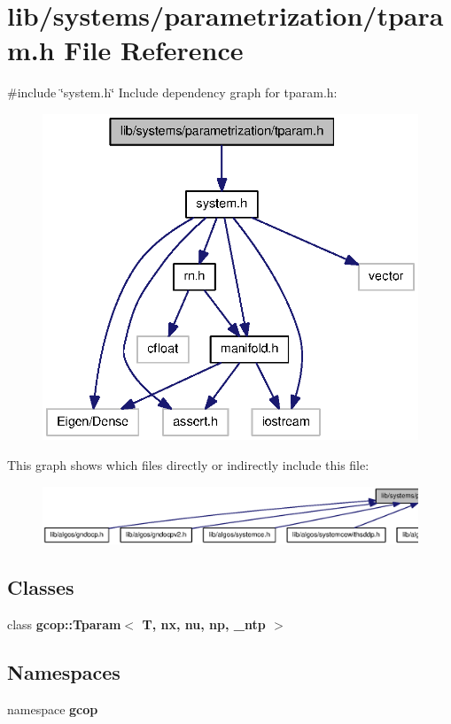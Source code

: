 \section{lib/systems/parametrization/tparam.h \-File \-Reference}
\label{tparam_8h}
{\ttfamily \#include \char`\"{}system.\-h\char`\"{}}\*
\-Include dependency graph for tparam.\-h\-:\nopagebreak
\begin{figure}[H]
\begin{center}
\leavevmode
\includegraphics[width=336pt]{tparam_8h__incl}
\end{center}
\end{figure}
\-This graph shows which files directly or indirectly include this file\-:
\nopagebreak
\begin{figure}[H]
\begin{center}
\leavevmode
\includegraphics[width=350pt]{tparam_8h__dep__incl}
\end{center}
\end{figure}
\subsection*{\-Classes}
\begin{DoxyCompactItemize}
\item 
class {\bf gcop\-::\-Tparam$<$ T, nx, nu, np, \-\_\-ntp $>$}
\end{DoxyCompactItemize}
\subsection*{\-Namespaces}
\begin{DoxyCompactItemize}
\item 
namespace {\bf gcop}
\end{DoxyCompactItemize}
